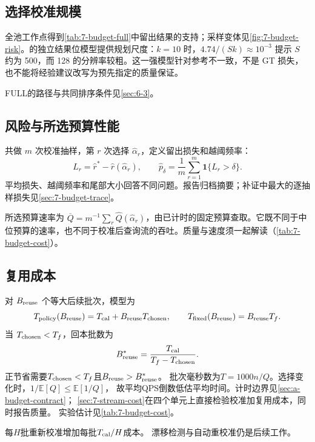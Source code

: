 \subsection{选择校准规模}

全池工作点得到\cref{tab:7-budget-full}中留出结果的支持；采样变体见\cref{fig:7-budget-risk}。的独立结果位模型提供规划尺度：$k=10$ 时，$4.74/(Sk)\approx10^{-3}$ 提示 $S$ 约为 500，而 128 的分辨率较粗。这一强模型针对参考不一致，不是 GT 损失，也不能将经验建议改写为预先指定的质量保证。

FULL的路径与共同排序条件见\cref{sec:6-3}。


\subsection{风险与所选预算性能}

共做 $m$ 次校准抽样，第 $r$ 次选择 $\widehat\alpha_r$，定义留出损失和越阈频率：
\begin{equation}
 L_r=\widehat r^*-\widehat r(\widehat\alpha_r),\qquad
 \widehat p_\delta=\frac{1}{m}\sum_{r=1}^{m}\mathbf1\{L_r>\delta\}.
 \label{eq:6-risk}
\end{equation}
平均损失、越阈频率和尾部大小回答不同问题。报告归档摘要；补证中最大的逐抽样损失见\cref{sec:7-budget-trace}。

所选预算速率为 $\overline Q=m^{-1}\sum_r\widehat Q(\widehat\alpha_r)$，由已计时的固定预算查取。它既不同于中位预算的速率，也不同于校准后查询流的吞吐。质量与速度须一起解读（\cref{tab:7-budget-cost}）。

\subsection{复用成本}

对 $B_{\rm reuse}$ 个等大后续批次，模型为
\begin{equation}
 T_{\rm policy}(B_{\rm reuse})=T_{\rm cal}+B_{\rm reuse}T_{\rm chosen},\qquad
 T_{\rm fixed}(B_{\rm reuse})=B_{\rm reuse}T_f.
 \label{eq:6-total-cost}
\end{equation}
当 $T_{\rm chosen}<T_f$，回本批数为
\begin{equation}
 B_{\rm reuse}^*=\frac{T_{\rm cal}}{T_f-T_{\rm chosen}}.
 \label{eq:6-payback}
\end{equation}
正节省需要$T_{\rm chosen}<T_f$且$B_{\rm reuse}>B_{\rm reuse}^*$。
批次毫秒数为$T=1000n/Q$。选择变化时，$1/\mathbb E[Q]\leq\mathbb E[1/Q]$，
故平均QPS倒数低估平均时间。计时边界见\cref{sec:a-budget-contract}；
\cref{sec:7-stream-cost}在四个单元上直接检验校准加复用成本，同时报告质量。
实验估计见\cref{tab:7-budget-cost}。

每$H$批重新校准增加每批$T_{\rm cal}/H$成本。
漂移检测与自动重校准仍是后续工作。
